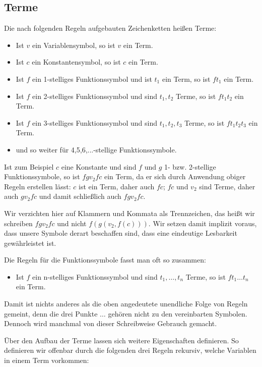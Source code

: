 \subsection{Terme}
Die nach folgenden Regeln aufgebauten Zeichenketten heißen Terme:
\begin{itemize}
	\item Ist $v$ ein Variablensymbol, so ist $v$ ein Term.
	\item Ist $c$ ein Konstantensymbol, so ist $c$ ein Term.
	\item Ist $f$ ein 1-stelliges Funktionssymbol und ist $t_1$ ein Term, so ist $ft_1$ ein Term.
	\item Ist $f$ ein 2-stelliges Funktionssymbol und sind $t_1,t_2$ Terme, so ist $ft_1t_2$ ein Term.
	\item Ist $f$ ein 3-stelliges Funktionssymbol und sind $t_1,t_2,t_3$ Terme, so ist $ft_1t_2t_3$ ein Term.
	\item und so weiter für 4,5,6,...-stellige Funktionssymbole.
\end{itemize}

Ist zum Beispiel $c$ eine Konstante und sind $f$ und $g$ 1- bzw. 2-stellige Funktionssymbole, so ist $fgv_2fc$ ein Term, da er sich durch Anwendung obiger Regeln erstellen lässt: $c$ ist ein Term, daher auch $fc$; $fc$ und $v_2$ sind Terme, daher auch $gv_2fc$ und damit schließlich auch $fgv_2fc$.

Wir verzichten hier auf Klammern und Kommata als Trennzeichen, das heißt wir schreiben $fgv_2fc$ und nicht $f(g(v_2,f(c)))$. Wir setzen damit implizit voraus, dass unsere Symbole derart beschaffen sind, dass eine eindeutige Lesbarkeit gewährleistet ist.

Die Regeln für die Funktionssymbole fasst man oft so zusammen:

\begin{itemize}
	\item Ist $f$ ein n-stelliges Funktionssymbol und sind $t_1,\ldots,t_n$ Terme, so ist $ft_1\ldots t_n$ ein Term.
\end{itemize}

Damit ist nichts anderes als die oben angedeutete unendliche Folge von Regeln gemeint, denn die drei Punkte $\ldots$ gehören nicht zu den vereinbarten Symbolen. Dennoch wird manchmal von dieser Schreibweise Gebrauch gemacht.

Über den Aufbau der Terme lassen sich weitere Eigenschaften definieren. So definieren wir offenbar durch die folgenden drei Regeln rekursiv, welche Variablen in einem Term vorkommen:

